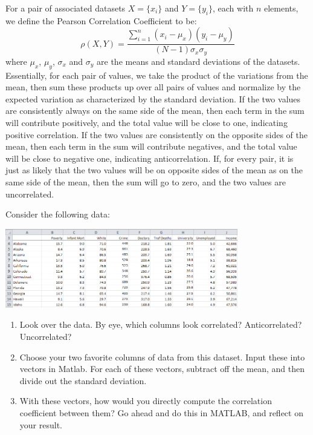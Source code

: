 For a pair of associated datasets $X = \{x_i\}$ and $Y = \{y_i\}$, each with $n$ elements, we define the Pearson Correlation Coefficient to be:
\begin{equation}
\rho(X,Y) = \frac{\sum_{i=1}^n (x_i - \mu_x)(y_i - \mu_y)}{(N-1) \sigma_x \sigma_y}
\end{equation}
where $\mu_x$, $\mu_y$, $\sigma_x$ and $\sigma_y$ are the means and standard deviations of the datasets.  Essentially, for each pair of values, we take the product of the variations from the mean, then sum these products up over all pairs of values and normalize by the expected variation as characterized by the standard deviation.  If the two values are consistently always on the same side of the mean, then each term in the sum will contribute positively, and the total value will be close to one, indicating positive correlation.  If the two values are consistently on the opposite sides of the mean, then each term in the sum will contribute negatives, and the total value will be close to negative one, indicating anticorrelation.  If, for every pair, it is just as likely that the two values will be on opposite sides of the mean as on the same side of the mean, then the sum will go to zero, and the two values are uncorrelated.


Consider the following data:

\begin{center}
  \includegraphics[width=4in]{FacesNight3/figs/us-states-statistics.png}
\end{center}

\begin{prob}
\begin{enumerate}
\item Look over the data.  By eye, which columns look correlated?  Anticorrelated? Uncorrelated?
\item  Choose your two favorite columns of data from this dataset.  Input these into vectors in Matlab.  For each of these vectors, subtract off the mean, and then divide out the standard deviation.
\item With these vectors, how would you directly compute the correlation coefficient between them? Go ahead and do this in MATLAB, and reflect on your result.
\end{enumerate}
\end{prob}

